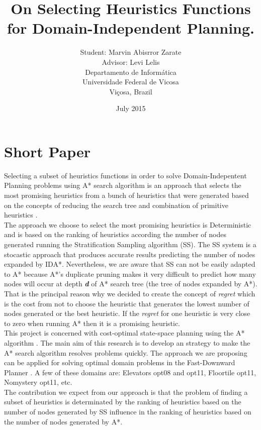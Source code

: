 \documentclass[11pt,a4paper,oneside]{report}
\begin{document}
\title{On Selecting Heuristics Functions for Domain-Independent Planning.}
\providecommand{\keywords}[1]{\textbf{keywords} #1}
\author{Student: Marvin Abisrror Zarate\\ Advisor: Levi Lelis \\
Departamento de Informática \\Universidade Federal de Vicosa \\Viçosa, Brazil}

\date{\color{black}July 2015}
\maketitle

\section{Short Paper}
\label{sec:1}
Selecting a subset of heuristics functions in order to solve Domain-Indepentent Planning problems using A* search algorithm is an approach that selects the most promising heuristics from a bunch of heuristics that were generated based on the concepts of reducing the search tree and combination of primitive heuristics \citep{BarleySantiagoOver}.\\

The approach we choose to select the most promising heuristics is Deterministic and is based on the ranking of heuristics according the number of nodes generated running the Stratification Sampling algorithm (SS). The SS system \citep{lelis2013predicting} is a stocastic approach that produces accurate results predicting the number of nodes expanded by IDA*. Nevertheless, we are aware that SS can not be easily adapted to A* because A*'s duplicate pruning makes it very difficult to predict how many nodes will occur at depth \textit{\textbf{d}} of A* search tree (the tree of nodes expanded by A*). That is the principal reason why we decided to create the concept of \textit{regret} which is the cost from not to choose the heuristic that generates the lowest number of nodes generated or the best heuristic. If the \textit{regret} for one heuristic is very close to zero when running A* then it is a promising heuristic.\\

This project is concerned with cost-optimal state-space planning using the A* algorithm \citep{hart1968formal}. The main aim of this research is to develop an strategy to make the A* search algorithm resolves problems quickly. The approach we are proposing can be applied for solving optimal domain problems in the Fast-Downward Planner \citep{helmert2006fast}. A few of these domains are: Elevators opt08 and opt11, Floortile opt11, Nomystery opt11, etc.
\\

The contribution we expect from our approach is that the problem of finding a subset of heuristics is determinated by the ranking of heuristics based on the number of nodes generated by SS influence in the ranking of heuristics based on the number of nodes generated by A*.
\newpage


%
\end{document}
